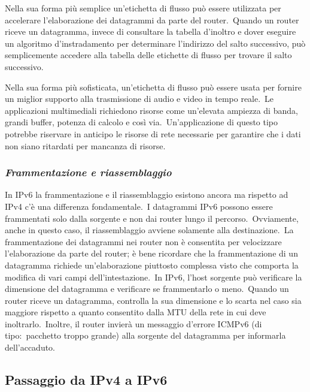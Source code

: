 Nella sua forma più semplice un'etichetta di flusso può essere utilizzata per accelerare l'elaborazione dei datagrammi da parte del router.\
Quando un router riceve un datagramma, invece di consultare la tabella d'inoltro e dover eseguire un algoritmo d'instradamento per determinare l'indirizzo del salto successivo, può semplicemente accedere alla tabella delle etichette di flusso per trovare il salto successivo.

Nella sua forma più sofisticata, un'etichetta di flusso può essere usata per fornire un miglior supporto alla trasmissione di audio e video in tempo reale.\
Le applicazioni multimediali richiedono risorse come un'elevata ampiezza di banda, grandi buffer, potenza di calcolo e così via.\
Un'applicazione di questo tipo potrebbe riservare in anticipo le risorse di rete necessarie per garantire che i dati non siano ritardati per mancanza di risorse.

\subsubsection{\emph{Frammentazione e riassemblaggio}}

In IPv6 la frammentazione e il riassemblaggio esistono ancora ma rispetto ad IPv4 c'è una differenza fondamentale.\
I datagrammi IPv6 possono essere frammentati solo dalla sorgente e non dai router lungo il percorso.\
Ovviamente, anche in questo caso, il riassemblaggio avviene solamente alla destinazione.\
La frammentazione dei datagrammi nei router non è consentita per velocizzare l'elaborazione da parte del router; è bene ricordare che la frammentazione di un datagramma richiede un'elaborazione piuttosto complessa visto che comporta la modifica di vari campi dell'intestazione.\
In IPv6, l'host sorgente può verificare la dimensione del datagramma e verificare se frammentarlo o meno.\
Quando un router riceve un datagramma, controlla la sua dimensione e lo scarta nel caso sia maggiore rispetto a quanto consentito dalla MTU della rete in cui deve inoltrarlo.\
Inoltre, il router invierà un messaggio d'errore ICMPv6 (di tipo:\ pacchetto troppo grande) alla sorgente del datagramma per informarla dell'accaduto.

\subsection{Passaggio da IPv4 a IPv6}

